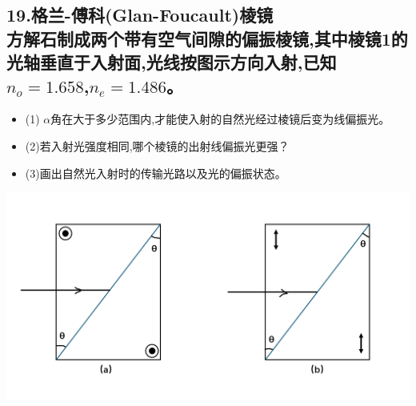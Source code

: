 \documentclass[11pt,a4paper]{article}
\begin{document}
    \subsection*{19.格兰-傅科(Glan-Foucault)棱镜\\方解石制成两个带有空气间隙的偏振棱镜,其中棱镜1的光轴垂直于入射面,光线按图示方向入射,已知\(n_{o}=1.658\),\(n_{e}=1.486\)。}
    \begin{itemize}
        \vspace{-3mm}
        \item (1) $\alpha $角在大于多少范围内,才能使入射的自然光经过棱镜后变为线偏振光。
        \vspace{-3mm}
        \item (2)若入射光强度相同,哪个棱镜的出射线偏振光更强？
        \vspace{-3mm}
        \item (3)画出自然光入射时的传输光路以及光的偏振状态。
    \end{itemize}
    \vspace{-3mm}
    \includegraphics[scale=0.3]{7.png}
\end{document}
